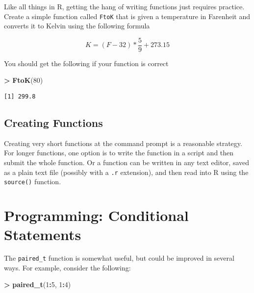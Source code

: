 \documentclass[
]{krantz}
\makeatletter
\newenvironment{Shaded}{\begin{snugshade}}{\end{snugshade}}
\newcommand{\DecValTok}[1]{\textcolor[rgb]{0.06,0.06,0.06}{#1}}
\newcommand{\KeywordTok}[1]{\textcolor[rgb]{0.27,0.27,0.27}{\textbf{#1}}}
\newcommand{\NormalTok}[1]{#1}
\newcommand{\OperatorTok}[1]{\textcolor[rgb]{0.43,0.43,0.43}{\textbf{#1}}}
\newcommand{\StringTok}[1]{\textcolor[rgb]{0.5,0.5,0.5}{#1}}
\newenvironment{kframe}{%
\medskip{}
\setlength{\fboxsep}{.8em}
 \def\at@end@of@kframe{}%
 \ifinner\ifhmode%
  \def\at@end@of@kframe{\end{minipage}}%
  \begin{minipage}{\columnwidth}%
 \fi\fi%
 \def\FrameCommand##1{\hskip\@totalleftmargin \hskip-\fboxsep
 \colorbox{shadecolor}{##1}\hskip-\fboxsep
     \hskip-\linewidth \hskip-\@totalleftmargin \hskip\columnwidth}%
 \MakeFramed {\advance\hsize-\width
   \@totalleftmargin\z@ \linewidth\hsize
   \@setminipage}}%
 {\par\unskip\endMakeFramed%
 \at@end@of@kframe}
\renewenvironment{Shaded}{\begin{kframe}}{\end{kframe}}
\makeatother
\begin{document}
Like all things in R, getting the hang of writing functions just requires practice. Create a simple function called \texttt{FtoK} that is given a temperature in Farenheit and converts it to Kelvin using the following formula

\[
K = (F - 32) * \frac{5}{9} + 273.15
\]

You should get the following if your function is correct

\begin{Shaded}
\begin{Highlighting}[]
\OperatorTok{\textgreater{}}\StringTok{ }\KeywordTok{FtoK}\NormalTok{(}\DecValTok{80}\NormalTok{)}
\end{Highlighting}
\end{Shaded}

\begin{verbatim}
[1] 299.8
\end{verbatim}

\hypertarget{creating-functions}{%
\subsection{Creating Functions}\label{creating-functions}}

Creating very short functions at the command prompt is a reasonable strategy. For longer functions, one option is to write the function in a script and then submit the whole function. Or a function can be written in any text editor, saved as a plain text file (possibly with a \texttt{.r} extension), and then read into R using the \texttt{source()} function.

\hypertarget{programming-conditional-statements}{%
\section{Programming: Conditional Statements}\label{programming-conditional-statements}}

The \texttt{paired\_t} function is somewhat useful, but could be improved in several ways. For example, consider the following:

\begin{Shaded}
\begin{Highlighting}[]
\OperatorTok{\textgreater{}}\StringTok{ }\KeywordTok{paired\_t}\NormalTok{(}\DecValTok{1}\OperatorTok{:}\DecValTok{5}\NormalTok{, }\DecValTok{1}\OperatorTok{:}\DecValTok{4}\NormalTok{)}
\end{Highlighting}
\end{Shaded}
\end{document}
